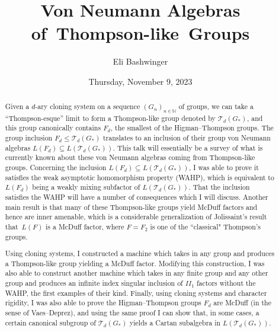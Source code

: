 \documentclass{UAmathtalk}
\author{Eli Bashwinger}
\title{Von Neumann Algebras of~Thompson-like~Groups}
\date{Thursday, November 9, 2023}
\begin{document}
\maketitle

\begin{abstract}
Given a $d$-ary cloning system on a sequence $(G_n)_{n \in \mathbb{N}}$ of groups, we can take a ``Thompson-esque'' limit to form a Thompson-like group denoted by $\mathscr{T}_d(G_*)$, and this group canonically contains $F_d$, the smallest of the Higman--Thompson groups. The group inclusion $F_d \le \mathscr{T}_d(G_*)$ translates to an inclusion of their group von Neumann algebras $L(F_d) \subseteq L(\mathscr{T}_d(G_*))$. This talk will essentially be a survey of what is currently known about these von Neumann algebras coming from Thompson-like groups. Concerning the inclusion $L(F_d) \subseteq L(\mathscr{T}_d(G_*))$, I was able to prove it satisfies the weak asymptotic homomorphism property (WAHP), which is equivalent to $L(F_d)$ being a weakly mixing subfactor of $L(\mathscr{T}_d(G_*))$. That the inclusion satisfies the WAHP will have a number of consequences which I will discuss. Another main result is that many of these Thompson-like groups yield McDuff factors and hence are inner amenable, which is a considerable generalization of Jolissaint's result that~$L(F)$ is a McDuff factor, where $F = F_2$ is one of the ``classical" Thompson's groups.

Using cloning systems, I constructed a machine which takes in any group and produces a Thompson-like group yielding a McDuff factor. Modifying this construction, I was also able to construct another machine which takes in any finite group and any other group and produces an infinite index singular inclusion of $\mathit{II}_1$ factors without the WAHP, the first examples of their kind. Finally, using cloning systems and character rigidity, I was also able to prove the Higman--Thompson groups $F_d$ are McDuff (in the sense of Vaes--Deprez), and using the same proof I can show that, in some cases, a certain canonical subgroup of $\mathscr{T}_d(G_*)$ yields a Cartan subalgebra in $L(\mathscr{T}_d(G_*))$. 
\end{abstract}
\end{document}
